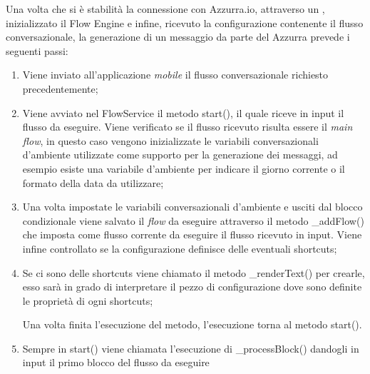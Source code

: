 Una volta che si è stabilità la connessione con Azzurra.io, attraverso un , inizializzato il Flow Engine e infine, ricevuto la configurazione  contenente il flusso conversazionale, la generazione di un messaggio da parte del  Azzurra prevede i seguenti passi:\\
\begin{enumerate}
	\item Viene inviato all’applicazione \emph{mobile} il flusso conversazionale richiesto precedentemente;
	\item Viene avviato nel FlowService il metodo start(), il quale riceve in input il flusso da eseguire. Viene verificato se il flusso ricevuto risulta essere il \emph{main flow}, in questo caso vengono inizializzate le variabili conversazionali d'ambiente utilizzate come supporto per la generazione dei messaggi, ad esempio esiste una variabile d'ambiente per indicare il giorno corrente o il formato della data da utilizzare;
	\item Una volta impostate le variabili conversazionali d’ambiente e usciti dal blocco condizionale viene salvato il \emph{flow} da eseguire attraverso il metodo \_addFlow() che imposta come flusso corrente da eseguire il flusso ricevuto in input. Viene infine controllato se la configurazione definisce delle eventuali shortcuts;
	\item Se ci sono delle shortcuts viene chiamato il metodo \_renderText() per crearle, esso sarà in grado di interpretare il pezzo di configurazione dove sono definite le proprietà di ogni shortcuts;
	
	Una volta finita l'esecuzione del metodo, l'esecuzione torna al metodo start().
	\item Sempre in start() viene chiamata l'esecuzione di \_processBlock() dandogli in input il primo blocco del flusso da eseguire
	

\end{enumerate}
